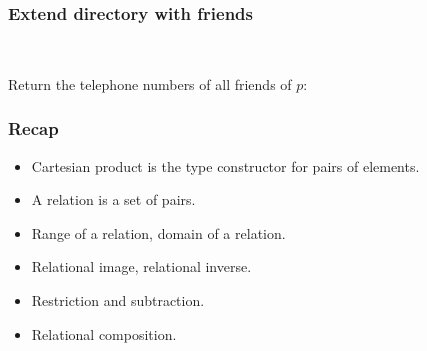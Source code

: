 \documentclass{beamer}
\begin{document}
\begin{frame}

\frametitle{Extend directory with friends}

%

~

Return the telephone numbers of all friends of $p$:



\end{frame}



\begin{frame}

\frametitle{Recap}
\begin{itemize}
\item Cartesian product is the type constructor  for pairs of elements.
\item A relation is a set of pairs.
\item Range of a relation, domain of a relation.
\item Relational image, relational inverse.
\item Restriction and subtraction.
\item Relational composition.
\end{itemize}


\end{frame}
\end{document}
